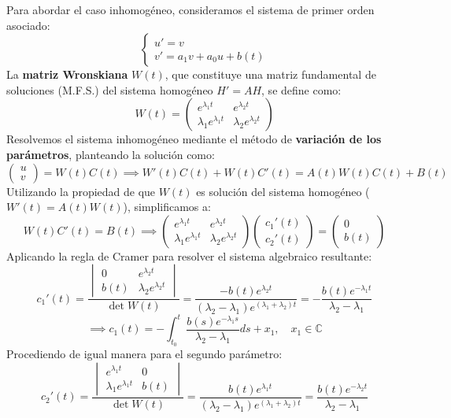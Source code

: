 {Para abordar el caso inhomogéneo, consideramos el sistema de primer orden asociado:
\[ \begin{cases} u' = v \\ v' = a_1 v + a_0 u + b(t) \end{cases} \]
La \textbf{matriz Wronskiana} $W(t)$, que constituye una matriz fundamental de soluciones (M.F.S.) del sistema homogéneo $H' = AH$, se define como:
\[ W(t) = \begin{pmatrix} e^{\lambda_1 t} & e^{\lambda_2 t} \\ \lambda_1 e^{\lambda_1 t} & \lambda_2 e^{\lambda_2 t} \end{pmatrix} \]
Resolvemos el sistema inhomogéneo mediante el método de \textbf{variación de los parámetros}, planteando la solución como:
\[ \begin{pmatrix} u \\ v \end{pmatrix} = W(t) C(t) \implies W'(t)C(t) + W(t)C'(t) = A(t)W(t)C(t) + B(t) \]
Utilizando la propiedad de que $W(t)$ es solución del sistema homogéneo ($W'(t) = A(t)W(t)$), simplificamos a:
\[ W(t)C'(t) = B(t) \implies \begin{pmatrix} e^{\lambda_1 t} & e^{\lambda_2 t} \\ \lambda_1 e^{\lambda_1 t} & \lambda_2 e^{\lambda_2 t} \end{pmatrix} \begin{pmatrix} c_1'(t) \\ c_2'(t) \end{pmatrix} = \begin{pmatrix} 0 \\ b(t) \end{pmatrix} \]
Aplicando la regla de Cramer para resolver el sistema algebraico resultante:
\[ c_1'(t) = \frac{\begin{vmatrix} 0 & e^{\lambda_2 t} \\ b(t) & \lambda_2 e^{\lambda_2 t} \end{vmatrix}}{\det W(t)} = \frac{-b(t)e^{\lambda_2 t}}{(\lambda_2 - \lambda_1) e^{(\lambda_1 + \lambda_2)t}} = -\frac{b(t)e^{-\lambda_1 t}}{\lambda_2 - \lambda_1} \]
\[ \implies c_1(t) = -\int_{t_0}^{t} \frac{b(s)e^{-\lambda_1 s}}{\lambda_2 - \lambda_1} ds + x_1, \quad x_1 \in \mathbb{C} \]
Procediendo de igual manera para el segundo parámetro:
\[ c_2'(t) = \frac{\begin{vmatrix} e^{\lambda_1 t} & 0 \\ \lambda_1 e^{\lambda_1 t} & b(t) \end{vmatrix}}{\det W(t)} = \frac{b(t)e^{\lambda_1 t}}{(\lambda_2 - \lambda_1) e^{(\lambda_1 + \lambda_2)t}} = \frac{b(t)e^{-\lambda_2 t}}{\lambda_2 - \lambda_1} \]
}
